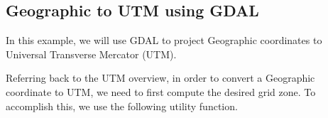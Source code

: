 %


\subsection*{Geographic to UTM using GDAL}

In this example, we will use GDAL to project Geographic coordinates to Universal Transverse
Mercator (UTM).  

Referring back to the UTM overview, in order to convert a Geographic coordinate
to UTM, we need to first compute the desired grid zone.  To accomplish this, we use
the following utility function. 






